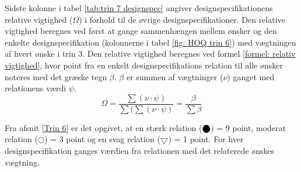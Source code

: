 Sidste kolonne i tabel \ref{tab:trin 7 designspec} angiver designspecifikationens relative vigtighed ($\Omega$) i forhold til de øvrige designspecifikationer. Den relative vigtighed beregnes ved først at gange sammenhængen mellem ønsker og den enkelte designspecifikation (kolonnerne i tabel \ref{fig: HOQ trin 6}) med vægtningen af hvert ønske i trin 3. Den relative vigtighed beregnes ved formel \ref{formel: relativ vigtighed}, hvor point fra en enkelt designspecifikations relation til alle ønsker noteres med det græske tegn $\beta$. $\beta$ er summen af vægtninger ($\nu$) ganget med relationens værdi $\psi$.
\begin{equation} \label{formel: relativ vigtighed}
    \Omega = \frac{\sum(\nu\cdot \psi)}{\sum(\sum(\nu\cdot \psi)} = \frac{\beta}{\sum\beta}
\end{equation}

Fra afsnit \ref{Trin 6} er det opgivet, at en stærk relation ($\blackbigcirc$) = 9 point, moderat relation ($\bigcirc$) = 3 point og en svag relation ($\bigtriangledown$) = 1 point. For hver designspecifikation ganges værdien fra relationen med det relaterede ønskes vægtning. 



